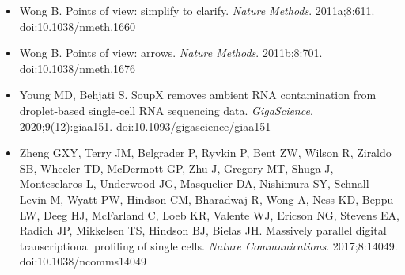 \begin{itemize}
\item Wong B. Points of view: simplify to clarify. \textit{Nature Methods}. 2011a;8:611. doi:10.1038/nmeth.1660
\item Wong B. Points of view: arrows. \textit{Nature Methods}. 2011b;8:701. doi:10.1038/nmeth.1676
\item Young MD, Behjati S. SoupX removes ambient RNA contamination from droplet-based single-cell RNA sequencing data. \textit{GigaScience}. 2020;9(12):giaa151. doi:10.1093/gigascience/giaa151
\item Zheng GXY, Terry JM, Belgrader P, Ryvkin P, Bent ZW, Wilson R, Ziraldo SB, Wheeler TD, McDermott GP, Zhu J, Gregory MT, Shuga J, Montesclaros L, Underwood JG, Masquelier DA, Nishimura SY, Schnall-Levin M, Wyatt PW, Hindson CM, Bharadwaj R, Wong A, Ness KD, Beppu LW, Deeg HJ, McFarland C, Loeb KR, Valente WJ, Ericson NG, Stevens EA, Radich JP, Mikkelsen TS, Hindson BJ, Bielas JH. Massively parallel digital transcriptional profiling of single cells. \textit{Nature Communications}. 2017;8:14049. doi:10.1038/ncomms14049
\end{itemize}

